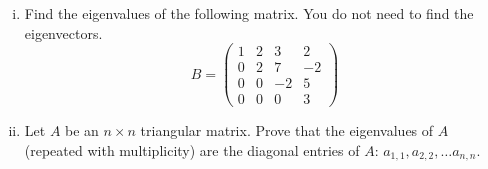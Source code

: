 \begin{question} 
\normalfont 
\begin{enumerate}[(i)]
 
 \item Find the eigenvalues of the following matrix. You do not need to find the eigenvectors.
 \[
 B = \begin{pmatrix}
			1 & 2 & 3 & 2\\
			0 & 2 & 7 & -2\\
			0 & 0 & -2 & 5\\
			0 & 0 & 0 & 3	
		\end{pmatrix}
 \]
 \vspace{.2cm}

\item Let $A$ be an $n\times n$ triangular matrix. Prove that the eigenvalues of $A$ (repeated with multiplicity) are the diagonal entries of $A$: $a_{1,1}, a_{2,2}, \ldots a_{n,n}$. 
	\normalfont		
\end{enumerate}	
	
	\end{question}
